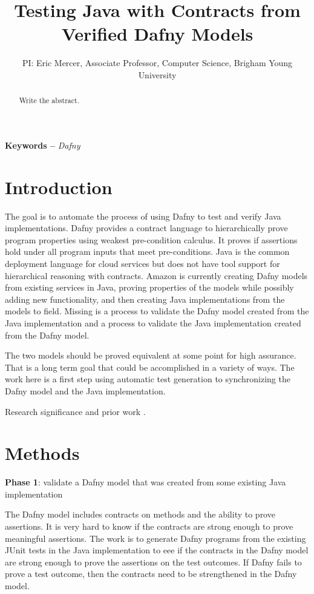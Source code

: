 \documentclass[11pt,onecolumn,notitlepage]{article}
\begin{document}
\title{Testing Java with Contracts from Verified Dafny Models}
\author{PI: Eric Mercer, Associate Professor, Computer Science, Brigham Young University}
\maketitle

\begin{abstract}
  Write the abstract.
\end{abstract}

\providecommand{\keywords}[1]{\noindent\textbf{Keywords -- } \textit{#1}}
\keywords{Dafny}

\section*{Introduction}
The goal is to automate the process of using Dafny to test and verify Java implementations.  Dafny provides a contract language to hierarchically prove program properties using weakest pre-condition calculus. It proves if assertions hold under all program inputs that meet pre-conditions. Java is the common deployment language for cloud services but does not have tool support for hierarchical reasoning with contracts. Amazon is currently creating Dafny models from existing services in Java, proving properties of the models while possibly adding new functionality, and then creating Java implementations from the models to field.  Missing is a process to validate the Dafny model created from the Java implementation and a process to validate the Java implementation created from the Dafny model. 
 
The two models should be proved equivalent at some point for high assurance. That is a long term goal that could be accomplished in a variety of ways. The work here is a first step using automatic test generation to synchronizing the Dafny model and the Java implementation. 

Research significance and prior work \cite{8972014}.

\section*{Methods}

\noindent\textbf{Phase 1}: validate a Dafny model that was created from some existing Java implementation

The Dafny model includes contracts on methods and the ability to prove assertions. It is very hard to know if the contracts are strong enough to prove meaningful assertions. The work is to generate Dafny programs from the existing JUnit tests in the Java implementation to eee if the contracts in the Dafny model are strong enough to prove the assertions on the test outcomes. If Dafny fails to prove a test outcome, then the contracts need to be strengthened in the Dafny model. 
\end{document}
